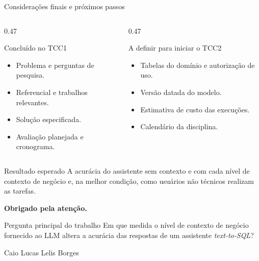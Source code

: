 \documentclass[aspectratio=169,10pt]{beamer}
\begin{document}
\begin{frame}{Considerações finais e próximos passos}
  \begin{columns}[T,onlytextwidth]
    \begin{column}{0.47\textwidth}
      \begin{block}{Concluído no TCC1}
        \small
        \begin{itemize}
          \item Problema e perguntas de pesquisa.
          \item Referencial e trabalhos relevantes.
          \item Solução especificada.
          \item Avaliação planejada e cronograma.
        \end{itemize}
      \end{block}
    \end{column}
    \begin{column}{0.47\textwidth}
      \begin{alertblock}{A definir para iniciar o TCC2}
        \small
        \begin{itemize}
          \item Tabelas do domínio e autorização de uso.
          \item Versão datada do modelo.
          \item Estimativa de custo das execuções.
          \item Calendário da disciplina.
        \end{itemize}
      \end{alertblock}
    \end{column}
  \end{columns}
  \vspace{1mm}
  \begin{exampleblock}{Resultado esperado}
    \small
    A acurácia do assistente sem contexto e com cada nível de contexto de negócio e, na melhor condição,
    como usuários não técnicos realizam as tarefas.
  \end{exampleblock}
\end{frame}

\begin{frame}{}
  \vspace{2mm}
  \centering
  {\LARGE\bfseries\color{UnBAzul}Obrigado pela atenção.}

  \vspace{6mm}
  \begin{minipage}{0.8\textwidth}
    \begin{block}{Pergunta principal do trabalho}
      Em que medida o nível de contexto de negócio fornecido ao LLM altera a acurácia das respostas
      de um assistente \textit{text-to-SQL}?
    \end{block}
  \end{minipage}

  \vspace{5mm}
  {\small Caio Lucas Lelis Borges}
\end{frame}
\end{document}
